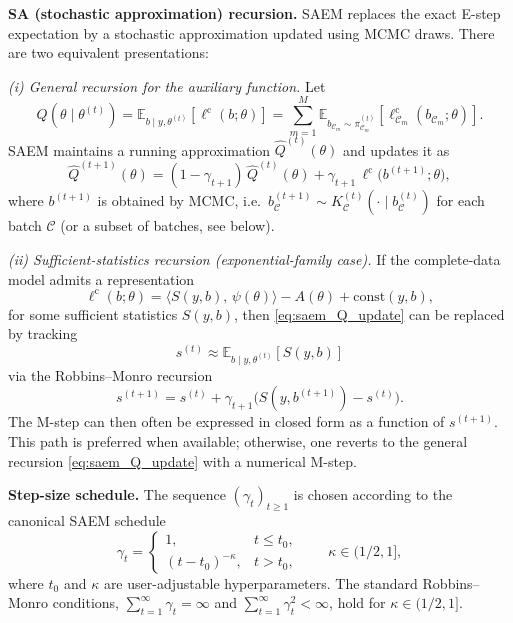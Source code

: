 \documentclass[12pt]{article}
\begin{document}
\textbf{SA (stochastic approximation) recursion.}
SAEM replaces the exact E-step expectation by a stochastic approximation updated using MCMC draws. There are two equivalent presentations:

\medskip
\noindent
\emph{(i) General recursion for the auxiliary function.}
Let
\[
Q(\theta\mid\theta^{(t)})
=
\mathbb{E}_{b\mid y,\theta^{(t)}}\!\left[\ell^{\mathrm{c}}(b;\theta)\right]
=
\sum_{m=1}^M
\mathbb{E}_{b_{\mathcal{C}_m}\sim \pi_{\mathcal{C}_m}^{(t)}}\!\left[\ell_{\mathcal{C}_m}^{\mathrm{c}}(b_{\mathcal{C}_m};\theta)\right].
\]
SAEM maintains a running approximation \(\widehat Q^{(t)}(\theta)\) and updates it as
\begin{equation}
\label{eq:saem_Q_update}
\widehat Q^{(t+1)}(\theta)
=
(1-\gamma_{t+1})\,\widehat Q^{(t)}(\theta)
+
\gamma_{t+1}\,
\ell^{\mathrm{c}}\!\big(b^{(t+1)};\theta\big),
\end{equation}
where \(b^{(t+1)}\) is obtained by MCMC, i.e.\ \(b_{\mathcal{C}}^{(t+1)}\sim K_{\mathcal{C}}^{(t)}(\cdot \mid b_{\mathcal{C}}^{(t)})\) for each batch \(\mathcal{C}\) (or a subset of batches, see below).

\medskip
\noindent
\emph{(ii) Sufficient-statistics recursion (exponential-family case).}
If the complete-data model admits a representation
\[
\ell^{\mathrm{c}}(b;\theta) = \langle S(y,b),\,\psi(\theta)\rangle - A(\theta) + \text{const}(y,b),
\]
for some sufficient statistics \(S(y,b)\), then \eqref{eq:saem_Q_update} can be replaced by tracking
\[
s^{(t)} \approx \mathbb{E}_{b\mid y,\theta^{(t)}}[S(y,b)]
\]
via the Robbins--Monro recursion
\begin{equation}
\label{eq:saem_s_update}
s^{(t+1)} = s^{(t)} + \gamma_{t+1}\Big(S(y,b^{(t+1)})-s^{(t)}\Big).
\end{equation}
The M-step can then often be expressed in closed form as a function of \(s^{(t+1)}\). This path is preferred when available; otherwise, one reverts to the general recursion \eqref{eq:saem_Q_update} with a numerical M-step.

\textbf{Step-size schedule.}
The sequence \((\gamma_t)_{t\ge 1}\) is chosen according to the canonical SAEM schedule
\[
\gamma_t
=
\begin{cases}
1, & t\le t_0,\\
(t-t_0)^{-\kappa}, & t>t_0,
\end{cases}
\qquad \kappa\in(1/2,1],
\]
where \(t_0\) and \(\kappa\) are user-adjustable hyperparameters. The standard Robbins--Monro conditions,
\(\sum_{t=1}^\infty \gamma_t = \infty\) and \(\sum_{t=1}^\infty \gamma_t^2 < \infty\),
hold for \(\kappa\in(1/2,1]\).
\end{document}
